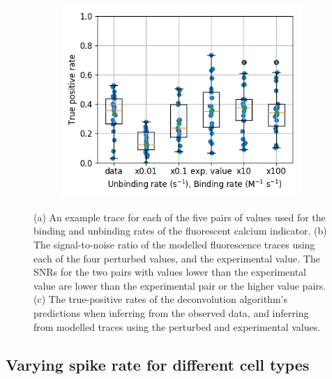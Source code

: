 \documentclass[a4paper,12pt]{article}
\theoremstyle{definition}
\begin{document}
\begin{figure}
\begin{subfigure}{0.5\textwidth}
	   \includegraphics[width=\linewidth]{figures/b_i_f_i_perturbed_oasis_tp_paper.png}
     \caption{}
  \end{subfigure}
  \caption{(a) An example trace for each of the five pairs of values used for the binding and unbinding rates of the fluorescent calcium indicator. (b) The signal-to-noise ratio of the modelled fluorescence traces using each of the four perturbed values, and the experimental value. The SNRs for the two pairs with values lower than the experimental value are lower than the experimental pair or the higher value pairs. (c) The true-positive rates of the deconvolution algorithm's predictions when inferring from the observed data, and inferring from modelled traces using the perturbed and experimental values.}
  \label{fig:rates_perturbed}
\end{figure}

\subsection{Varying spike rate for different cell types}
\end{document}
